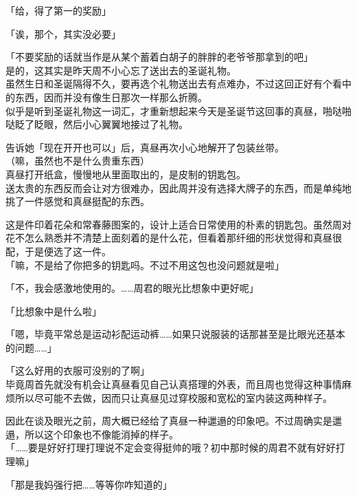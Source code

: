 「给，得了第一的奖励」

「诶，那个，其实没必要」

「不要奖励的话就当作是从某个蓄着白胡子的胖胖的老爷爷那拿到的吧」\\

是的，这其实是昨天周不小心忘了送出去的圣诞礼物。\\

虽然生日和圣诞隔得不久，要再选个礼物送出去有点难办，不过这回正好有个看中的东西，因而并没有像生日那次一样那么折腾。\\

似乎是听到圣诞礼物这一词汇，才重新想起来今天是圣诞节这回事的真昼，啪哒啪哒眨了眨眼，然后小心翼翼地接过了礼物。

告诉她「现在开开也可以」后，真昼再次小心地解开了包装丝带。\\

（嘛，虽然也不是什么贵重东西）\\

真昼打开纸盒，慢慢地从里面取出的，是皮制的钥匙包。\\

送太贵的东西反而会让对方很难办，因此周并没有选择大牌子的东西，而是单纯地挑了一件感觉和真昼挺配的东西。

这是件印着花朵和常春藤图案的，设计上适合日常使用的朴素的钥匙包。虽然周对花不怎么熟悉并不清楚上面刻着的是什么花，但看着那纤细的形状觉得和真昼很配，于是便选了这一件。\\

「嘛，不是给了你把多的钥匙吗。不过不用这包也没问题就是啦」

「不，我会感激地使用的。……周君的眼光比想象中更好呢」

「比想象中是什么啦」

「嗯，毕竟平常总是运动衫配运动裤……如果只说服装的话那甚至是比眼光还基本的问题……」

「这么好用的衣服可没别的了啊」\\

毕竟周首先就没有机会让真昼看见自己认真搭理的外表，而且周也觉得这种事情麻烦所以尽可能不去做，因而只让真昼见过穿校服和宽松的室内装这两种样子。

因此在谈及眼光之前，周大概已经给了真昼一种邋遢的印象吧。不过周确实是邋遢，所以这个印象也不像能消掉的样子。\\

「……要是好好打理打理说不定会变得挺帅的哦？初中那时候的周君不就有好好打理嘛」

「那是我妈强行把……等等你咋知道的」

